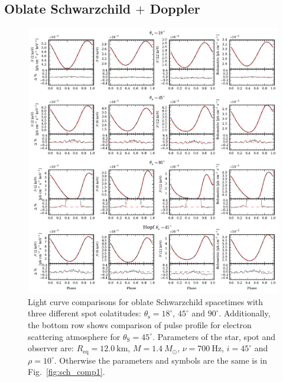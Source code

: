 \documentclass[iop, usenatbib]{emulateapj}
\newcommand{\Msun}{\ensuremath{M_{\odot}}}
\begin{document}
\subsection{Oblate Schwarzchild $+$ Doppler}



\begin{figure}
\centering
\includegraphics[width=18cm]{figs/fig4.pdf}
\caption{\label{fig:osch_comp700}
  Light curve comparisons for oblate Schwarzchild spacetimes with three different spot colatitudes: $\theta_{\mathrm{s}} = 18^{\circ}$, $45^{\circ}$ and $90^{\circ}$.
  Additionally, the bottom row shows comparison of pulse profile for electron scattering atmosphere for $\theta_{\mathrm{S}} = 45^{\circ}$.
  Parameters of the star, spot and observer are: $R_{\mathrm{eq}} = 12.0~\mathrm{km}$, $M = 1.4~\Msun$, $\nu = 700~\mathrm{Hz}$, $i = 45^{\circ}$ and $\rho = 10^{\circ}$.
  Otherwise the parameters and symbols are the same is in Fig.~\ref{fig:sch_comp1}.
  }
\end{figure}
\end{document}
